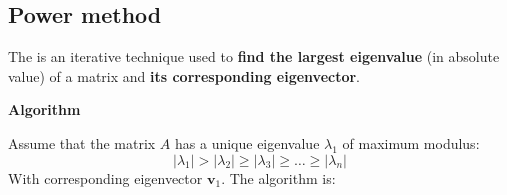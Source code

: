 \subsection{Power method}

The  is an iterative technique used to \textbf{find the largest eigenvalue} (in absolute value) of a matrix and \textbf{its corresponding eigenvector}.

\highspace
\begin{flushleft}
    \textcolor{Green3}{ \textbf{Algorithm}}
\end{flushleft}
Assume that the matrix $A$ has a unique eigenvalue $\lambda_{1}$ of maximum modulus:
\begin{equation*}
    \left|\lambda_{1}\right| > \left|\lambda_{2}\right| \ge \left|\lambda_{3}\right| \ge \dots \ge \left|\lambda_{n}\right|
\end{equation*}
With corresponding eigenvector $\mathbf{v}_{1}$. The algorithm is:
